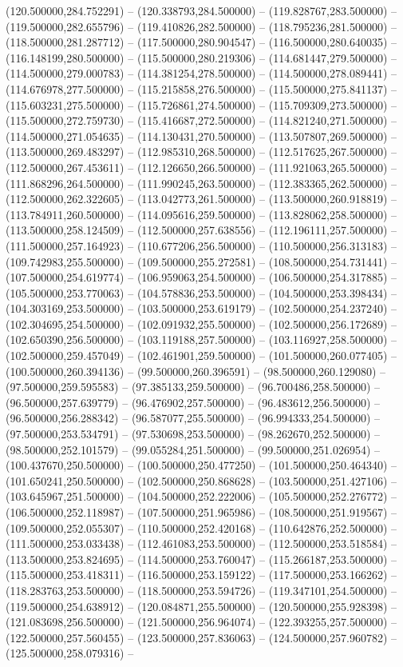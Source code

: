 (120.500000,284.752291) -- (120.338793,284.500000) -- (119.828767,283.500000) -- (119.500000,282.655796) -- (119.410826,282.500000) -- (118.795236,281.500000) -- (118.500000,281.287712) -- (117.500000,280.904547) -- (116.500000,280.640035) -- (116.148199,280.500000) -- (115.500000,280.219306) -- (114.681447,279.500000) -- (114.500000,279.000783) -- (114.381254,278.500000) -- (114.500000,278.089441) -- (114.676978,277.500000) -- (115.215858,276.500000) -- (115.500000,275.841137) -- (115.603231,275.500000) -- (115.726861,274.500000) -- (115.709309,273.500000) -- (115.500000,272.759730) -- (115.416687,272.500000) -- (114.821240,271.500000) -- (114.500000,271.054635) -- (114.130431,270.500000) -- (113.507807,269.500000) -- (113.500000,269.483297) -- (112.985310,268.500000) -- (112.517625,267.500000) -- (112.500000,267.453611) -- (112.126650,266.500000) -- (111.921063,265.500000) -- (111.868296,264.500000) -- (111.990245,263.500000) -- (112.383365,262.500000) -- (112.500000,262.322605) -- (113.042773,261.500000) -- (113.500000,260.918819) -- (113.784911,260.500000) -- (114.095616,259.500000) -- (113.828062,258.500000) -- (113.500000,258.124509) -- (112.500000,257.638556) -- (112.196111,257.500000) -- (111.500000,257.164923) -- (110.677206,256.500000) -- (110.500000,256.313183) -- (109.742983,255.500000) -- (109.500000,255.272581) -- (108.500000,254.731441) -- (107.500000,254.619774) -- (106.959063,254.500000) -- (106.500000,254.317885) -- (105.500000,253.770063) -- (104.578836,253.500000) -- (104.500000,253.398434) -- (104.303169,253.500000) -- (103.500000,253.619179) -- (102.500000,254.237240) -- (102.304695,254.500000) -- (102.091932,255.500000) -- (102.500000,256.172689) -- (102.650390,256.500000) -- (103.119188,257.500000) -- (103.116927,258.500000) -- (102.500000,259.457049) -- (102.461901,259.500000) -- (101.500000,260.077405) -- (100.500000,260.394136) -- (99.500000,260.396591) -- (98.500000,260.129080) -- (97.500000,259.595583) -- (97.385133,259.500000) -- (96.700486,258.500000) -- (96.500000,257.639779) -- (96.476902,257.500000) -- (96.483612,256.500000) -- (96.500000,256.288342) -- (96.587077,255.500000) -- (96.994333,254.500000) -- (97.500000,253.534791) -- (97.530698,253.500000) -- (98.262670,252.500000) -- (98.500000,252.101579) -- (99.055284,251.500000) -- (99.500000,251.026954) -- (100.437670,250.500000) -- (100.500000,250.477250) -- (101.500000,250.464340) -- (101.650241,250.500000) -- (102.500000,250.868628) -- (103.500000,251.427106) -- (103.645967,251.500000) -- (104.500000,252.222006) -- (105.500000,252.276772) -- (106.500000,252.118987) -- (107.500000,251.965986) -- (108.500000,251.919567) -- (109.500000,252.055307) -- (110.500000,252.420168) -- (110.642876,252.500000) -- (111.500000,253.033438) -- (112.461083,253.500000) -- (112.500000,253.518584) -- (113.500000,253.824695) -- (114.500000,253.760047) -- (115.266187,253.500000) -- (115.500000,253.418311) -- (116.500000,253.159122) -- (117.500000,253.166262) -- (118.283763,253.500000) -- (118.500000,253.594726) -- (119.347101,254.500000) -- (119.500000,254.638912) -- (120.084871,255.500000) -- (120.500000,255.928398) -- (121.083698,256.500000) -- (121.500000,256.964074) -- (122.393255,257.500000) -- (122.500000,257.560455) -- (123.500000,257.836063) -- (124.500000,257.960782) -- (125.500000,258.079316) -- 